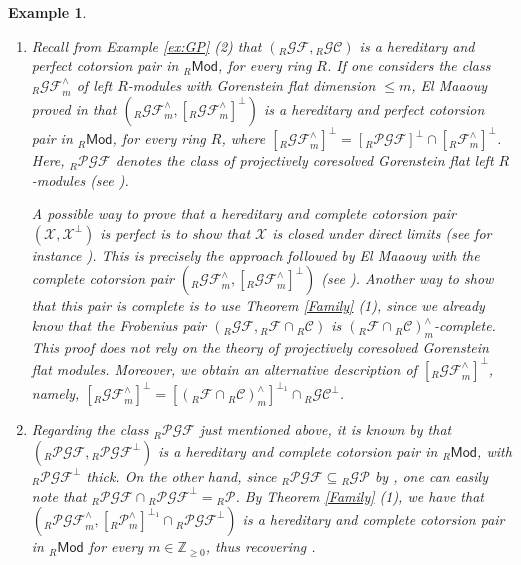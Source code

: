 \documentclass[10pt,reqno]{amsart}
\numberwithin{equation}{section}
\newtheorem{example}[definition]{Example}
\theoremstyle{remark}
\newcommand{\X}{\mathcal{X}}
\begin{document}
\begin{example}
\begin{enumerate}[(1)]
\item Recall from Example \ref{ex:GP} (2) that $({}_R\mathcal{GF},{}_R\mathcal{GC})$ is a hereditary and perfect cotorsion pair in ${}_R\mathsf{Mod}$, for every ring $R$. If one considers the class ${}_R\mathcal{GF}^\wedge_m$ of left $R$-modules with Gorenstein flat dimension $\leq m$, El Maaouy proved in \cite[Coroll. 3.5]{Rachid} that $({}_R\mathcal{GF}^\wedge_m,[{}_R\mathcal{GF}^\wedge_m]^{\perp})$ is a hereditary and perfect cotorsion pair in ${}_R\mathsf{Mod}$, for every ring $R$, where $[{}_R\mathcal{GF}^\wedge_m]^{\perp} = [{}_R\mathcal{PGF}]^{\perp} \cap [{}_R\mathcal{F}^\wedge_m]^{\perp}$. Here, ${}_R\mathcal{PGF}$ denotes the class of projectively coresolved Gorenstein flat left $R$-modules (see \cite[\S 4]{Saroch}).

A possible way to prove that a hereditary and complete cotorsion pair $(\X,\X^\perp)$ is perfect is to show that $\X$ is closed under direct limits (see for instance \cite[Prop. 3.1]{GT06}). This is precisely the approach followed by El Maaouy with the complete cotorsion pair $({}_R\mathcal{GF}^\wedge_m,[{}_R\mathcal{GF}^\wedge_m]^{\perp})$ (see \cite[Coroll. 3.5]{Rachid}). Another way to show that this pair is complete is to use Theorem \ref{Family} (1), since we already know that the Frobenius pair $({}_R\mathcal{GF},{}_R\mathcal{F} \cap {}_R\mathcal{C})$ is $({}_R\mathcal{F} \cap {}_R\mathcal{C})^\wedge_m$-complete. This proof does not rely on the theory of projectively coresolved Gorenstein flat modules. Moreover, we obtain an alternative description of $[{}_R\mathcal{GF}^\wedge_m]^{\perp}$, namely, $[{}_R\mathcal{GF}^\wedge_m]^{\perp} = [({}_R\mathcal{F} \cap {}_R\mathcal{C})^\wedge_m]^{\perp_1} \cap {}_R\mathcal{GC}^\perp$. 

\item Regarding the class ${}_R\mathcal{PGF}$ just mentioned above, it is known by \cite[Thm. 4.9]{Saroch} that $({}_R\mathcal{PGF},{}_R\mathcal{PGF}^\perp)$ is a hereditary and complete cotorsion pair in ${}_R\mathsf{Mod}$, with ${}_R\mathcal{PGF}^\perp$ thick. On the other hand, since ${}_R\mathcal{PGF} \subseteq {}_R\mathcal{GP}$ by \cite[Thm. 4.4]{Saroch}, one can easily note that ${}_R\mathcal{PGF} \cap {}_R\mathcal{PGF}^\perp = {}_R\mathcal{P}$. By Theorem \ref{Family} (1), we have that $({}_R\mathcal{PGF}^{\wedge}_m, [{}_R\mathcal{P}^{\wedge}_m]^{\perp_1} \cap {}_R\mathcal{PGF}^\perp)$ is a hereditary and complete cotorsion pair in ${}_R\mathsf{Mod}$ for every $m \in \mathbb{Z}_{\geq 0}$, thus recovering \cite[Coroll. 2.6 (1)]{Chains}. 
\end{enumerate}
\end{example}
\end{document}
